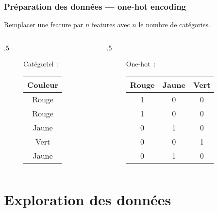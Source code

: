 \documentclass{formation}
\begin{document}
\begin{frame}
  \frametitle{Préparation des données — one-hot encoding}

  Remplacer une feature par $n$ features avec $n$ le nombre de
  catégories.
  \begin{columns}
    \begin{column}{.5\tw}
      \begin{figure}
        \centering
        Catégoriel :\\[.5cm]

        \begin{tabular}{c}
          \toprule
          Couleur \\
          \midrule
          Rouge \\
          Rouge \\
          Jaune \\
          Vert \\
          Jaune \\
          \bottomrule
        \end{tabular}
      \end{figure}
    \end{column}
    \begin{column}{.5\tw}
      \begin{figure}
        \centering
        One-hot :\\[.5cm]

        \begin{tabular}{ccc}
          \toprule
          Rouge & Jaune & Vert \\
          \midrule
          1 & 0 & 0 \\
          1 & 0 & 0 \\
          0 & 1 & 0 \\
          0 & 0 & 1 \\
          0 & 1 & 0 \\
          \bottomrule
        \end{tabular}
      \end{figure}
    \end{column}
  \end{columns}
\end{frame}

\section{Exploration des données}
\end{document}
